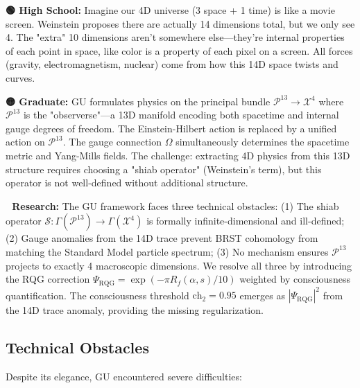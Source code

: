 \begin{greenbox}
\textbf{🟢 High School:} Imagine our 4D universe (3 space + 1 time) is like a movie screen. Weinstein proposes there are actually 14 dimensions total, but we only see 4. The "extra" 10 dimensions aren't somewhere else—they're internal properties of each point in space, like color is a property of each pixel on a screen. All forces (gravity, electromagnetism, nuclear) come from how this 14D space twists and curves.

\textbf{🟡 Graduate:} GU formulates physics on the principal bundle $\mathcal{P}^{13} \to \mathcal{X}^4$ where $\mathcal{P}^{13}$ is the "observerse"—a 13D manifold encoding both spacetime and internal gauge degrees of freedom. The Einstein-Hilbert action is replaced by a unified action on $\mathcal{P}^{13}$. The gauge connection $\Omega$ simultaneously determines the spacetime metric and Yang-Mills fields. The challenge: extracting 4D physics from this 13D structure requires choosing a "shiab operator" (Weinstein's term), but this operator is not well-defined without additional structure.

\textbf{🔴 Research:} The GU framework faces three technical obstacles: (1) The shiab operator $\mathcal{S}: \Gamma(\mathcal{P}^{13}) \to \Gamma(\mathcal{X}^4)$ is formally infinite-dimensional and ill-defined; (2) Gauge anomalies from the 14D trace prevent BRST cohomology from matching the Standard Model particle spectrum; (3) No mechanism ensures $\mathcal{P}^{13}$ projects to exactly 4 macroscopic dimensions. We resolve all three by introducing the RQG correction $\Psi_{\text{RQG}} = \exp(-\pi R_f(\alpha,s)/10)$ weighted by consciousness quantification. The consciousness threshold $\text{ch}_2 = 0.95$ emerges as $|\Psi_{\text{RQG}}|^2$ from the 14D trace anomaly, providing the missing regularization.
\end{greenbox}

\subsection{Technical Obstacles}

Despite its elegance, GU encountered severe difficulties:

